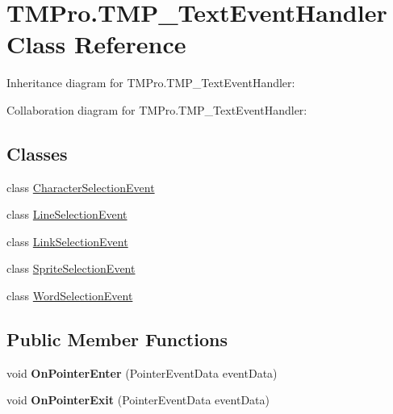 \hypertarget{classTMPro_1_1TMP__TextEventHandler}{}\section{T\+M\+Pro.\+T\+M\+P\+\_\+\+Text\+Event\+Handler Class Reference}
\label{classTMPro_1_1TMP__TextEventHandler}


Inheritance diagram for T\+M\+Pro.\+T\+M\+P\+\_\+\+Text\+Event\+Handler\+:


Collaboration diagram for T\+M\+Pro.\+T\+M\+P\+\_\+\+Text\+Event\+Handler\+:
\subsection*{Classes}
\begin{DoxyCompactItemize}
\item 
class \hyperlink{classTMPro_1_1TMP__TextEventHandler_1_1CharacterSelectionEvent}{Character\+Selection\+Event}
\item 
class \hyperlink{classTMPro_1_1TMP__TextEventHandler_1_1LineSelectionEvent}{Line\+Selection\+Event}
\item 
class \hyperlink{classTMPro_1_1TMP__TextEventHandler_1_1LinkSelectionEvent}{Link\+Selection\+Event}
\item 
class \hyperlink{classTMPro_1_1TMP__TextEventHandler_1_1SpriteSelectionEvent}{Sprite\+Selection\+Event}
\item 
class \hyperlink{classTMPro_1_1TMP__TextEventHandler_1_1WordSelectionEvent}{Word\+Selection\+Event}
\end{DoxyCompactItemize}
\subsection*{Public Member Functions}
\begin{DoxyCompactItemize}
\item 
\mbox{\label{classTMPro_1_1TMP__TextEventHandler_a2aabc4e44e30d86b783edb3d4a2f2d9b}} 
void {\bfseries On\+Pointer\+Enter} (Pointer\+Event\+Data event\+Data)
\item 
\mbox{\label{classTMPro_1_1TMP__TextEventHandler_a0ad3fd5e712593130a9669706aa55906}} 
void {\bfseries On\+Pointer\+Exit} (Pointer\+Event\+Data event\+Data)
\end{DoxyCompactItemize}
